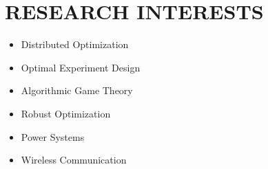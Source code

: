\documentclass[paper=a4,fontsize=11pt]{scrartcl} %
\newcommand{\NewPart}[1]{\section*{\uppercase{#1}}}
\newcommand{\EducationEntry}[4]{
	\noindent \textbf{#1} \hfill      %
	\colorbox{White}{%
		\parbox{5cm}{%
			\hfill\color{Black}#2}} \par  %
	\noindent \textit{#3} \par        %
	\noindent\hangindent=2em\hangafter=0 \small #4 %
	\normalsize \par}
\begin{document}
		\NewPart{RESEARCH INTERESTS}{}
		\begin{itemize}
			
			\item{Distributed Optimization}
			\item{Optimal Experiment Design}
			
			
			
			\item{Algorithmic Game Theory}
			
			\item{Robust Optimization}
			
			\item{Power Systems}
			\item{Wireless Communication}
		\end{itemize}
		
\end{document}
